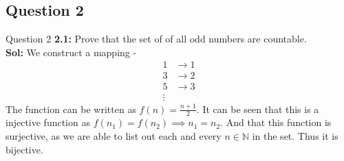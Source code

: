 \documentclass[xcolor=svgnames]{beamer}
\begin{document}
\subsection{Question 2}

\begin{frame}{Question 2}
    \textbf{2.1:} Prove that the set of of all odd numbers are countable.
    \\ \textbf{Sol:} We construct a mapping - 
    \begin{align*}
        1 &\rightarrow 1
        \\ 3 &\rightarrow 2
        \\ 5 &\rightarrow 3
        \\ \vdots 
    \end{align*}
    The function can be written as $f(n) = \frac{n + 1}{2}$. It can be seen that this is a injective function as $f(n_1) = f(n_2) \implies n_1 = n_2$. And that this function is surjective, as we are able  to list out each and every $n \in \mathbb{N}$ in the set. Thus it is bijective.
\end{frame}
\end{document}
